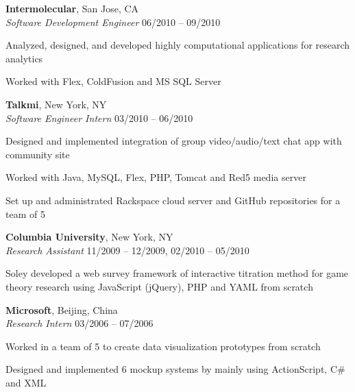 \documentclass[margin,line]{resume}
\begin{document}
\begin{resume}
    \textbf{Intermolecular}, San Jose, CA \\
    \textsl{Software Development Engineer} \hfill 06/2010 -- 09/2010 \vspace{-3mm}\\\vspace{-1mm}%
      \begin{list2}
      \item Analyzed, designed, and developed highly computational applications for research analytics
      \item Worked with Flex, ColdFusion and MS SQL Server
      \end{list2}

    \textbf{Talkmi}, New York, NY \\
    \textsl{Software Engineer Intern} \hfill 03/2010 -- 06/2010 \vspace{-3mm}\\\vspace{-1mm}%
      \begin{list2}
      \item Designed and implemented integration of group video/audio/text chat app with community site
      \item Worked with Java, MySQL, Flex, PHP, Tomcat and Red5 media server	    
      \item Set up and administrated Rackspace cloud server and GitHub repositories for a team of 5
      \end{list2}

    \textbf{Columbia University}, New York, NY \\
    \textsl{Research Assistant} \hfill 11/2009 -- 12/2009, 02/2010 -- 05/2010 \vspace{-3mm}\\\vspace{-1mm}%
      \begin{list2} 
      \item Soley developed a web survey framework of interactive titration method for game theory research using JavaScript (jQuery), PHP and YAML from scratch
      \end{list2}

    \textbf{Microsoft}, Beijing, China \\
    \textsl{Research Intern} \hfill 03/2006 -- 07/2006 \vspace{-3mm}\\\vspace{-1mm}%
      \begin{list2}
      \item Worked in a team of 5 to create data visualization prototypes from scratch
      \item Designed and implemented 6 mockup systems by mainly using ActionScript, C\# and XML
      \end{list2}


\end{resume}
\end{document}
